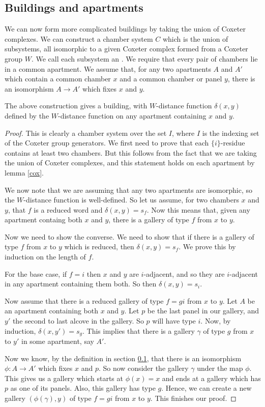 \documentclass[11pt]{article}
\begin{document}
\subsection{Buildings and apartments}\label{apartments}
We can now form more complicated buildings by taking the union of Coxeter complexes. We can construct a chamber system $C$ which is the union of subsystems, all isomorphic to a given Coxeter complex formed from a Coxeter group $W$. We call each subsystem an . We require that every pair of chambers lie in a common apartment. We assume that, for any two apartments $A$ and $A'$ which contain a common chamber $x$ and a common chamber or panel $y$, there is an isomorphism $A\to A'$ which fixes $x$ and $y$.  

\begin{theorem}
    The above construction gives a building, with $W$-distance function $\delta(x,y)$ defined by the $W$-distance function on any apartment containing $x$ and $y$. 
\end{theorem}

\begin{proof}
    This is clearly a chamber system over the set $I$, where $I$ is the indexing set of the Coxeter group generators. We first need to prove that each $\{i\}$-residue contains at least two chambers. But this follows from the fact that we are taking the union of Coxeter complexes, and this statement holds on each apartment by lemma \ref{cox}. 

    We now note that we are assuming that any two apartments are isomorphic, so the $W$-distance function is well-defined. So let us assume, for two chambers $x$ and $y$, that $f$ is a reduced word and $\delta(x,y)=s_f$. Now this means that, given any apartment containg both $x$ and $y$, there is a gallery of type $f$ from $x$ to $y$. 

    Now we need to show the converse. We need to show that if there is a gallery of type $f$ from $x$ to $y$ which is reduced, then $\delta(x,y)=s_f$. We prove this by induction on the length of $f$. 

    For the base case, if $f=i$ then $x$ and $y$ are $i$-adjacent, and so they are $i$-adjacent in any apartment containing them both. So then $\delta(x,y)=s_i$.

    Now assume that there is a reduced gallery of type $f=gi$ from $x$ to $y$. Let $A$ be an apartment containing both $x$ and $y$. Let $p$ be the last panel in our gallery, and $y'$ the second to last alcove in the gallery. So $p$ will have type $i$. Now, by induction, $\delta(x,y')=s_g$. This implies that there is a gallery $\gamma$ of type $g$ from $x$ to $y'$ in some apartment, say $A'$.
    
    Now we know, by the definition in section \ref{apartments}, that there is an isomorphism $\phi : A\to A'$ which fixes $x$ and $p$. So now consider the gallery $\gamma$ under the map $\phi$. This gives us a gallery which starts at $\phi(x)=x$ and ends at a gallery which has $p$ as one of its panels. Also, this gallery has type $g$. Hence, we can create a new gallery $(\phi(\gamma),y)$ of type $f=gi$ from $x$ to $y$. This finishes our proof.
\end{proof}
\end{document}
